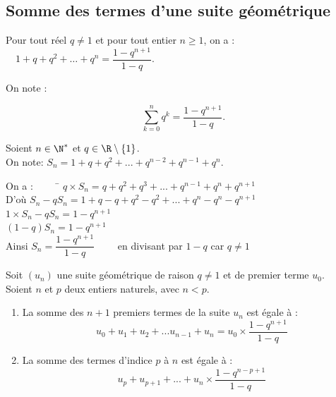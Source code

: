 \documentclass[a4paper,11pt,cours]{nsi} %
\begin{document}
\begin{demonstration}
\end{demonstration}

\subsection*{Somme des termes d'une suite géométrique}

\begin{propriete}
	Pour tout réel $q\neq 1$ et pour tout entier $n\geqslant 1$, on a :
	$\quad 1+q+q^2+\ldots+q^n=\dfrac{1-q^{n+1}}{1-q}.$
	\begin{minipage}{2cm}
		On note :
	\end{minipage}
	\begin{minipage}{6cm}
		$$\sum_{k=0}^n q^k = \frac{1-q^{n+1}}{1-q}.$$
	\end{minipage}
\end{propriete}

\begin{demonstration}
	Soient $n\in\N^*$ et $q\in\R\setminus \left\{1\right\}$.\\
	On note: $S_n=1+q+q^2+...+q^{n-2}+q^{n-1}+q^n$.
	\begin{tabbing}
		On a : $\qquad$ \= $q \times S_n=q+q^2+q^3+...+q^{n-1}+q^n+q^{n+1}$\\[.5em]
		D'où \> $S_n-qS_n = 1 + q-q + q^2-q^2 + ... + q^n-q^n-q^{n+1}$\\[.5em]
			\>	$1\times S_n -qS_n=1-q^{n+1}$\\[.5em]
			\>	$(1-q) S_n=1-q^{n+1}$\\[.5em]
		Ainsi	\>	$S_n=\dfrac{1-q^{n+1}}{1-q} \qquad$ en divisant par $1-q$ car $q\neq 1$
	\end{tabbing}
\end{demonstration}

\begin{propriete}
	Soit $(u_n)$ une suite géométrique de raison $q\neq 1$ et de premier terme $u_0$.\\
	Soient $n$ et $p $ deux entiers naturels, avec $n<p$.
	\begin{enumerate}[label=\textbullet]
		\item La somme des $n+1$ premiers termes de la suite $u_n$ est égale à :
		$$u_0+u_1+u_2+...u_{n-1}+u_n=u_0\times \dfrac{1-q^{n+1}}{1-q}$$
		\item La somme des termes d'indice $p$ à $n$ est égale à :
		$$u_p+u_{p+1}+...+u_n\times \dfrac{1-q^{n-p+1}}{1-q}$$
	\end{enumerate}
\end{propriete}
\end{document}
